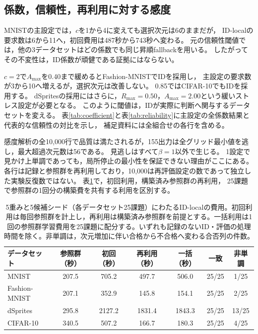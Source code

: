 \documentclass[11pt,a4paper]{ltjsarticle}
\begin{document}
\subsection{係数，信頼性，再利用に対する感度}\label{sec:idsensitivity}
MNISTの主設定では，$c$を1から4に変えても選択次元は6のままだが，
ID-localの要求数は6から11へ，初回費用は487秒から743秒へ変わる。
元の信頼性閾値では，他の3データセットはどの係数でも同じ昇順fallbackを用いる。
したがってその不変性は，ID係数が頑健である証拠にはならない。

$c=2$で$A_{\max}$を0.40まで緩めるとFashion-MNISTでIDを採用し，
主設定の要求数が3から10へ増えるが，選択次元は改善しない。
0.85ではCIFAR-10でもIDを採用する。
dSpritesの採用にはさらに，$R_{\max}=0.50$，$A_{\max}=2.00$という緩いストレス設定が必要となる。
このように閾値は，IDが実際に判断へ関与するデータセットを変える。
表\ref{tab:coefficient}と表\ref{tab:reliability}に主設定の全係数結果と代表的な信頼性の対比を示し，
補足資料には全組合せの各行を含める。

感度解析の全10,000行で品質は満たされるが，155出力は全グリッド最小値を逃し，最大超過次元数は56である。
見逃しはすべて$\beta=1$以外で生じる。
1設定で見かけ上単調であっても，局所停止の最小性を保証できない理由がここにある。
各行は記録と参照群を再利用しており，10,000は再評価設定の数であって独立した実験反復数ではない。
表\ref{tab:amortization}で，初回利用，構築済み参照群の再利用，
25課題で参照群の1回分の構築費を共有する利用を区別する。
\begin{table}[H]
\caption{5重みと5候補シード（各データセット25課題）にわたるID-localの費用。初回利用は毎回参照群を計上し，再利用は構築済み参照群を前提とする。一括利用は1回の参照群学習費用を25課題に配分する。いずれも記録のないID・評価の処理時間を除く。非単調は，次元増加に伴い合格から不合格へ変わる合否列の件数。}\label{tab:amortization}
\small
\setlength{\tabcolsep}{3pt}
\begin{tabular*}{\textwidth}{@{\extracolsep{\fill}}lcccccc@{}}
\toprule
データセット & 参照群（秒） & 初回（秒） & 再利用（秒） & 一括（秒） & 一致 & 非単調 \\
\midrule
MNIST & 207.5 & 705.2 & 497.7 & 506.0 & 25/25 & 1/25 \\
Fashion-MNIST & 207.1 & 352.9 & 145.8 & 154.1 & 25/25 & 2/25 \\
dSprites & 295.8 & 2127.2 & 1831.4 & 1843.3 & 25/25 & 13/25 \\
CIFAR-10 & 340.5 & 507.2 & 166.7 & 180.3 & 25/25 & 4/25 \\
\bottomrule\end{tabular*}
\end{table}
\end{document}
